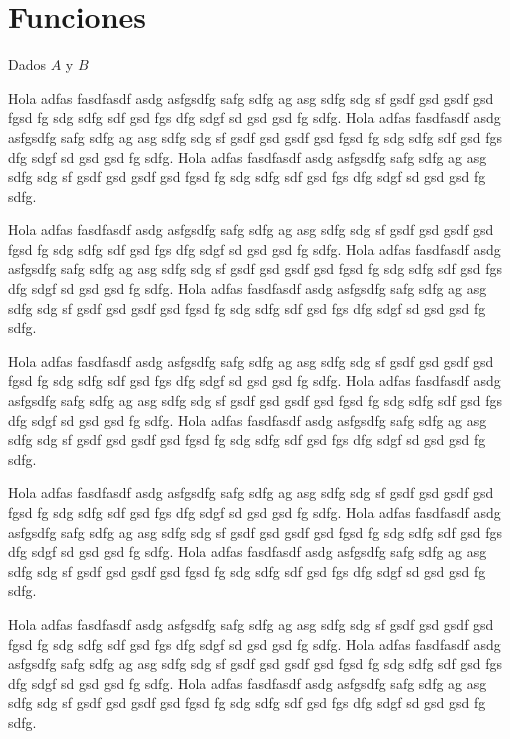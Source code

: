 \documentclass[compacto,10pt,comentarios]{aleph-notas}
\begin{document}
\encabezado

\vspace*{-8mm}
\section{Funciones}

\begin{defi}[Función]
    Dados $A$ y $B$ 
\end{defi}


\begin{comentarios}
    Hola adfas fasdfasdf asdg asfgsdfg safg sdfg ag asg sdfg sdg sf gsdf gsd gsdf gsd fgsd fg sdg sdfg sdf gsd fgs dfg sdgf sd gsd gsd fg sdfg. Hola adfas fasdfasdf asdg asfgsdfg safg sdfg ag asg sdfg sdg sf gsdf gsd gsdf gsd fgsd fg sdg sdfg sdf gsd fgs dfg sdgf sd gsd gsd fg sdfg. Hola adfas fasdfasdf asdg asfgsdfg safg sdfg ag asg sdfg sdg sf gsdf gsd gsdf gsd fgsd fg sdg sdfg sdf gsd fgs dfg sdgf sd gsd gsd fg sdfg.
    
    Hola adfas fasdfasdf asdg asfgsdfg safg sdfg ag asg sdfg sdg sf gsdf gsd gsdf gsd fgsd fg sdg sdfg sdf gsd fgs dfg sdgf sd gsd gsd fg sdfg. Hola adfas fasdfasdf asdg asfgsdfg safg sdfg ag asg sdfg sdg sf gsdf gsd gsdf gsd fgsd fg sdg sdfg sdf gsd fgs dfg sdgf sd gsd gsd fg sdfg. Hola adfas fasdfasdf asdg asfgsdfg safg sdfg ag asg sdfg sdg sf gsdf gsd gsdf gsd fgsd fg sdg sdfg sdf gsd fgs dfg sdgf sd gsd gsd fg sdfg.
    
    Hola adfas fasdfasdf asdg asfgsdfg safg sdfg ag asg sdfg sdg sf gsdf gsd gsdf gsd fgsd fg sdg sdfg sdf gsd fgs dfg sdgf sd gsd gsd fg sdfg. Hola adfas fasdfasdf asdg asfgsdfg safg sdfg ag asg sdfg sdg sf gsdf gsd gsdf gsd fgsd fg sdg sdfg sdf gsd fgs dfg sdgf sd gsd gsd fg sdfg. Hola adfas fasdfasdf asdg asfgsdfg safg sdfg ag asg sdfg sdg sf gsdf gsd gsdf gsd fgsd fg sdg sdfg sdf gsd fgs dfg sdgf sd gsd gsd fg sdfg.
    
    Hola adfas fasdfasdf asdg asfgsdfg safg sdfg ag asg sdfg sdg sf gsdf gsd gsdf gsd fgsd fg sdg sdfg sdf gsd fgs dfg sdgf sd gsd gsd fg sdfg. Hola adfas fasdfasdf asdg asfgsdfg safg sdfg ag asg sdfg sdg sf gsdf gsd gsdf gsd fgsd fg sdg sdfg sdf gsd fgs dfg sdgf sd gsd gsd fg sdfg. Hola adfas fasdfasdf asdg asfgsdfg safg sdfg ag asg sdfg sdg sf gsdf gsd gsdf gsd fgsd fg sdg sdfg sdf gsd fgs dfg sdgf sd gsd gsd fg sdfg.
    
    Hola adfas fasdfasdf asdg asfgsdfg safg sdfg ag asg sdfg sdg sf gsdf gsd gsdf gsd fgsd fg sdg sdfg sdf gsd fgs dfg sdgf sd gsd gsd fg sdfg. Hola adfas fasdfasdf asdg asfgsdfg safg sdfg ag asg sdfg sdg sf gsdf gsd gsdf gsd fgsd fg sdg sdfg sdf gsd fgs dfg sdgf sd gsd gsd fg sdfg. Hola adfas fasdfasdf asdg asfgsdfg safg sdfg ag asg sdfg sdg sf gsdf gsd gsdf gsd fgsd fg sdg sdfg sdf gsd fgs dfg sdgf sd gsd gsd fg sdfg.
    

\end{comentarios}
\end{document}
